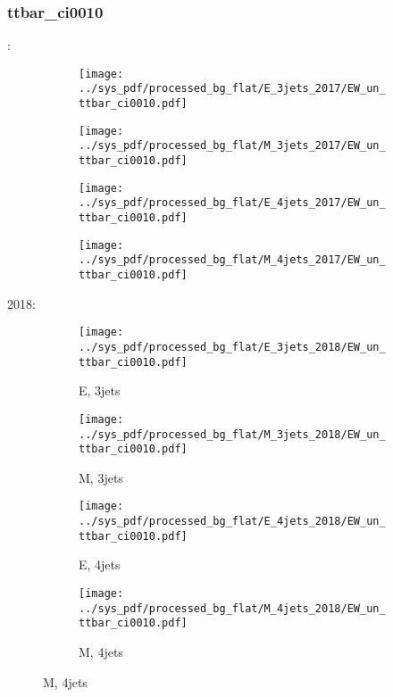 \documentclass{beamer}
\begin{document}
\begin{frame}
\frametitle{ttbar_ci0010}
\fontsize{5}{1}:
\begin{figure}
\centering
\begin{subfigure}[b]{0.24\textwidth}
\texttt{[image: ../sys\_pdf/processed\_bg\_flat/E\_3jets\_2017/EW\_un\_ttbar\_ci0010.pdf]}
\end{subfigure}
\begin{subfigure}[b]{0.24\textwidth}
\texttt{[image: ../sys\_pdf/processed\_bg\_flat/M\_3jets\_2017/EW\_un\_ttbar\_ci0010.pdf]}
\end{subfigure}
\begin{subfigure}[b]{0.24\textwidth}
\texttt{[image: ../sys\_pdf/processed\_bg\_flat/E\_4jets\_2017/EW\_un\_ttbar\_ci0010.pdf]}
\end{subfigure}
\begin{subfigure}[b]{0.24\textwidth}
\texttt{[image: ../sys\_pdf/processed\_bg\_flat/M\_4jets\_2017/EW\_un\_ttbar\_ci0010.pdf]}
\end{subfigure}
\end{figure}
2018:
\begin{figure}
\centering
\begin{subfigure}[b]{0.24\textwidth}
\texttt{[image: ../sys\_pdf/processed\_bg\_flat/E\_3jets\_2018/EW\_un\_ttbar\_ci0010.pdf]}
\captionsetup{font=tiny}
\caption{E, 3jets}
\end{subfigure}
\begin{subfigure}[b]{0.24\textwidth}
\texttt{[image: ../sys\_pdf/processed\_bg\_flat/M\_3jets\_2018/EW\_un\_ttbar\_ci0010.pdf]}
\captionsetup{font=tiny}
\caption{M, 3jets}
\end{subfigure}
\begin{subfigure}[b]{0.24\textwidth}
\texttt{[image: ../sys\_pdf/processed\_bg\_flat/E\_4jets\_2018/EW\_un\_ttbar\_ci0010.pdf]}
\captionsetup{font=tiny}
\caption{E, 4jets}
\end{subfigure}
\begin{subfigure}[b]{0.24\textwidth}
\texttt{[image: ../sys\_pdf/processed\_bg\_flat/M\_4jets\_2018/EW\_un\_ttbar\_ci0010.pdf]}
\captionsetup{font=tiny}
\caption{M, 4jets}
\end{subfigure}
\end{figure}
\end{frame}
\end{document}
